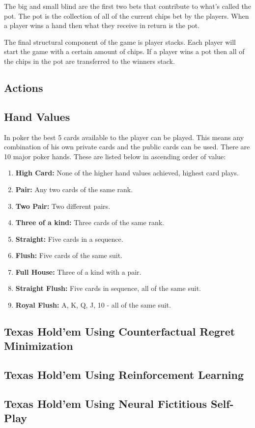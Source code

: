 The big and small blind are the first two bets that contribute to what's called the pot.
The pot is the collection of all of the current chips bet by the players.
When a player wins a hand then what they receive in return is the pot.

The final structural component of the game is player stacks.
Each player will start the game with a certain amount of chips.
If a player wins a pot then all of the chips in the pot are transferred to the winners stack.

\subsection{Actions}\label{subsec:actions}

\subsection{Hand Values}\label{subsec:handValues}
In poker the best 5 cards available to the player can be played.
This means any combination of his own private cards and the public cards can be used.
There are 10 major poker hands.
These are listed below in ascending order of value:
\begin{enumerate}
    \item \textbf{High Card:} None of the higher hand values achieved, highest card plays.
    \item \textbf{Pair:} Any two cards of the same rank.
    \item \textbf{Two Pair:} Two different pairs.
    \item \textbf{Three of a kind:} Three cards of the same rank.
    \item \textbf{Straight:} Five cards in a sequence.
    \item \textbf{Flush:} Five cards of the same suit.
    \item \textbf{Full House:} Three of a kind with a pair.
    \item \textbf{Straight Flush:} Five cards in sequence, all of the same suit.
    \item \textbf{Royal Flush:} A, K, Q, J, 10 - all of the same suit.
\end{enumerate}

\subsection{Texas Hold'em Using Counterfactual Regret Minimization}\label{subsec:thCFR}

\subsection{Texas Hold'em Using Reinforcement Learning}\label{subsec:thRL}

\subsection{Texas Hold'em Using Neural Fictitious Self-Play}\label{subsec:thNFSP}

